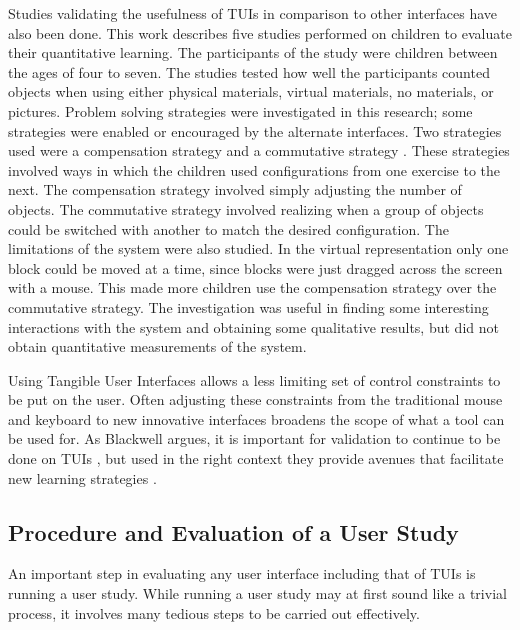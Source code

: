 Studies validating the usefulness of TUIs in comparison to other interfaces have also been done.   This work  \cite{1517688} describes five studies performed on children to evaluate their quantitative learning. The participants of the study were children between the ages of four to seven.  The studies tested how well the participants counted objects when using either physical materials, virtual materials, no materials, or pictures. Problem solving strategies were investigated in this research; some strategies were enabled or encouraged by the alternate interfaces. Two strategies used were a compensation strategy and a commutative strategy .  These strategies involved ways in which the children used configurations from one exercise to the next.  The compensation strategy involved simply adjusting the number of objects.  The commutative strategy involved realizing when a group of objects could be switched with another to match the desired configuration.
The limitations of the system were also studied.  In the virtual representation only one block could be moved at a time, since blocks were just dragged across the screen with a mouse. This made more children use the compensation strategy over the commutative strategy.  The investigation was useful in finding some interesting interactions with the system and obtaining some qualitative results, but did not obtain quantitative measurements of the system.  

Using Tangible User Interfaces allows a less limiting set of control constraints to be put on the user.  Often adjusting these constraints from the traditional mouse and keyboard to new innovative interfaces broadens the scope of what a tool can be used for.  As Blackwell argues, it is important for validation to continue to be done on TUIs \cite{Blackwell}, but used in the right context they provide avenues that facilitate new learning strategies \cite{1517688}.

\subsection{Procedure and Evaluation of a User Study}

An important step in evaluating any user interface including that of TUIs is running a user study.  While running a user study may at first sound like a trivial process, it involves many tedious steps to be carried out effectively.

